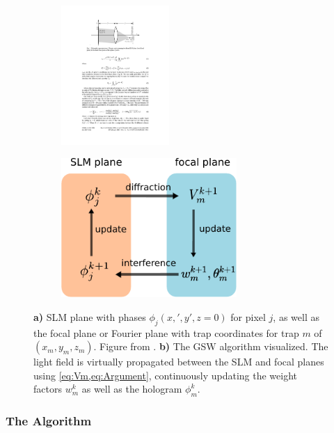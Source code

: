 \begin{figure}
	\centering
	\begin{subfigure}{.56\textwidth}
		\centering
		\includegraphics[height=5.3cm]{figures/SLMgeometry.pdf}
		\caption{}
		\label{fig:SLMgeometry}
	\end{subfigure}
	\begin{subfigure}{.43\textwidth}
		\centering
		\includegraphics[height=5.3cm]{figures/WeightedGerschbergSaxton.pdf}
		\caption{}
		\label{fig:GSWalgorithm}
	\end{subfigure}
	\caption{\textbf{a)} SLM plane with phases $\phi_j(x,',y',z=0)$ for pixel $j$, as well as the focal plane or Fourier plane with trap coordinates for trap $m$ of $(x_m,y_m,z_m)$. 
		Figure from \cite{DiLeonardo2007}. 
		\textbf{b)} The \ac{GSW} algorithm visualized.
		The light field is virtually propagated between the SLM and focal planes using \cref{eq:Vm,eq:Argument}, continuously updating the weight factors $w_m^k$ as well as the hologram $\phi_m^k$.}
	\label{fig:GerschbergSaxton}
\end{figure}

\subsubsection*{The Algorithm}

